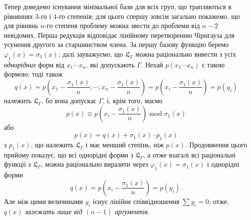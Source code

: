 \documentclass[11pt]{article}
\begin{document}
Тепер доведемо існування мінімальної бази для всіх груп, що трапляються в рівняннях 3-го і 4-го степенів; для цього спершу зовсім загально покажемо, що для рівнянь $n$-го степеня проблему можна звести до проблеми від $n-2$ невідомих. Перша редукція відповідає лінійному перетворенню Чірнгауза для усунення другого за старшинством члена. За першу базову функцію беремо $\varphi_1(x)=\sigma_1(x)$; далі зауважуємо, що $\mathfrak L_\Gamma$ можна раціонально вивести з усіх \emph{однорідних} форм від $x_1\cdots x_n$, які допускають $\Gamma$. Нехай $p(x_1\cdots x_n)$ є такою формою; тоді також
\[
q(x)=p\left(x_1-\frac{\sigma_1(x)}{n};\cdots;x_n-\frac{\sigma_1(x)}{n}\right)=p\left(x_i-\frac{\sigma_1(x)}{n}\right)=p(y_i)
\]
належить $\mathfrak L_\Gamma$, бо вона допускає $\Gamma$, і, крім того, маємо
\[
p(x)\equiv p\left(x_i-\frac{\sigma_1(x)}{n}\right)\operatorname{mod}\sigma_1(x)
\]
або
\[
p(x)=q(x)+\sigma_1(x)\cdot p_1(x)
\]
з $p_1(x)$, що належить $\mathfrak L_\Gamma$ і має менший степінь, ніж $p(x)$. Продовження цього прийому показує, що всі однорідні форми з $\mathfrak L_\Gamma$, а отже взагалі всі раціональні функції з $\mathfrak L_\Gamma$, можна раціонально виразити через $\varphi_1(x)=\sigma_1(x)$ і однорідні форми
\[
q(x)=p\left(x_i-\frac{\sigma_1(x)}{n}\right)=p(y_i).
\]
Але між цими величинами $y_i$ існує лінійне співвідношення $\sum y_i=0$; отже, $q(x)$ \emph{залежать лише від $(n-1)$ аргументів.}
\end{document}
